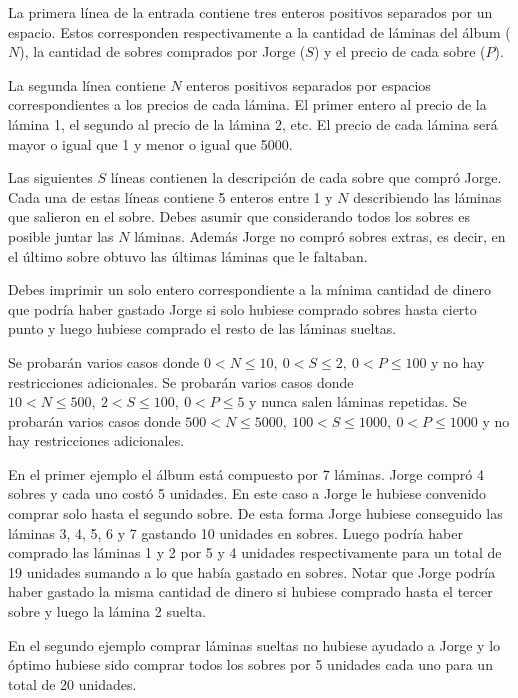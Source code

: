 \documentclass{oci}
\begin{document}
\begin{inputDescription}
La primera línea de la entrada contiene tres enteros positivos separados por un espacio.
Estos corresponden respectivamente a la cantidad de láminas del álbum ($N$), la cantidad de sobres comprados por Jorge ($S$) y el precio de cada sobre ($P$).

La segunda línea contiene $N$ enteros positivos separados por espacios correspondientes a los precios de cada lámina.
El primer entero al precio de la lámina 1, el segundo al precio de la lámina 2, etc.
El precio de cada lámina será mayor o igual que 1 y menor o igual que 5000.

Las siguientes $S$ líneas contienen la descripción de cada sobre que compró Jorge.
Cada una de estas líneas contiene 5 enteros entre 1 y $N$ describiendo las láminas que salieron en el sobre.
Debes asumir que considerando todos los sobres es posible juntar las $N$ láminas. 
Además Jorge no compró sobres extras, es decir, en el último sobre obtuvo las últimas láminas que le faltaban.
\end{inputDescription}

\begin{outputDescription}
Debes imprimir un solo entero correspondiente a la mínima cantidad de dinero que podría haber gastado Jorge si solo hubiese comprado sobres hasta cierto punto y luego hubiese comprado el resto de las láminas sueltas.
\end{outputDescription}

\begin{scoreDescription}
   Se probarán varios casos donde
 $0 < N \leq 10,\ 0 < S \leq 2,\ 0 < P \leq 100$ y no hay restricciones adicionales.
   Se probarán varios casos donde
 $10 < N \leq 500,\ 2 < S \leq 100,\ 0<P\leq 5 $ y nunca salen láminas repetidas.
   Se probarán varios casos donde
 $500<N\leq 5000,\ 100 < S \leq 1000,\ 0<P\leq 1000$ y no hay restricciones adicionales.
\end{scoreDescription}

\begin{sampleDescription}

En el primer ejemplo el álbum está compuesto por 7 láminas.
Jorge compró 4 sobres y cada uno costó 5 unidades.
En este caso a Jorge le hubiese convenido comprar solo hasta el segundo sobre.
De esta forma Jorge hubiese conseguido las láminas 3, 4, 5, 6 y 7 gastando 10 unidades en sobres.
Luego podría haber comprado las láminas 1 y 2 por 5 y 4 unidades respectivamente para un total de 19 unidades sumando a lo que había gastado en sobres.
Notar que Jorge podría haber gastado la misma cantidad de dinero si hubiese comprado hasta el tercer sobre y luego la lámina 2 suelta.

En el segundo ejemplo comprar láminas sueltas no hubiese ayudado a Jorge y lo óptimo hubiese sido comprar todos los sobres por 5 unidades cada uno para un total de 20 unidades.

\end{sampleDescription}
\end{document}

